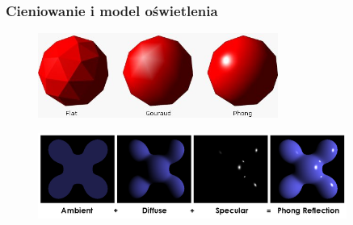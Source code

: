\documentclass[aspectratio=169]{beamer}
\begin{document}
\begin{frame}[allowframebreaks]
	\frametitle{Cieniowanie i model oświetlenia}	
	\begin{figure}
		\centering
		\includegraphics[width=0.7\textwidth]{shading.jpg}
	\end{figure}
	\framebreak
	\begin{figure}
		\centering
		\includegraphics[width=0.9\textwidth]{phong.png}
	\end{figure}
\end{frame}

%	
\end{document}
